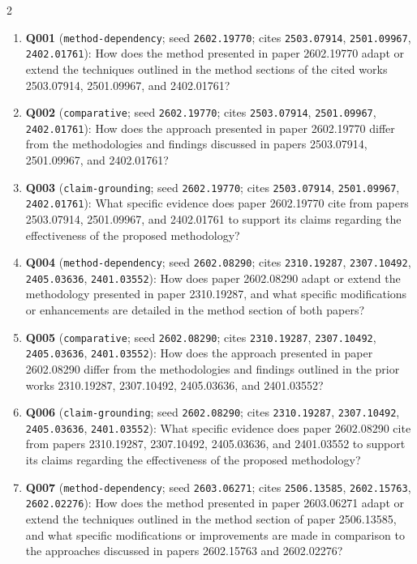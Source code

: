 \documentclass[10pt]{article}
\begin{document}
{\scriptsize\sloppy
\begin{multicols}{2}
\begin{enumerate}[leftmargin=1.0em,itemsep=0.05em,topsep=0pt,parsep=0pt]
  \item \textbf{Q001} (\texttt{method-dependency}; seed \texttt{2602.19770}; cites \texttt{2503.07914}, \texttt{2501.09967}, \texttt{2402.01761}): How does the method presented in paper 2602.19770 adapt or extend the techniques outlined in the method sections of the cited works 2503.07914, 2501.09967, and 2402.01761?
  \item \textbf{Q002} (\texttt{comparative}; seed \texttt{2602.19770}; cites \texttt{2503.07914}, \texttt{2501.09967}, \texttt{2402.01761}): How does the approach presented in paper 2602.19770 differ from the methodologies and findings discussed in papers 2503.07914, 2501.09967, and 2402.01761?
  \item \textbf{Q003} (\texttt{claim-grounding}; seed \texttt{2602.19770}; cites \texttt{2503.07914}, \texttt{2501.09967}, \texttt{2402.01761}): What specific evidence does paper 2602.19770 cite from papers 2503.07914, 2501.09967, and 2402.01761 to support its claims regarding the effectiveness of the proposed methodology?
  \item \textbf{Q004} (\texttt{method-dependency}; seed \texttt{2602.08290}; cites \texttt{2310.19287}, \texttt{2307.10492}, \texttt{2405.03636}, \texttt{2401.03552}): How does paper 2602.08290 adapt or extend the methodology presented in paper 2310.19287, and what specific modifications or enhancements are detailed in the method section of both papers?
  \item \textbf{Q005} (\texttt{comparative}; seed \texttt{2602.08290}; cites \texttt{2310.19287}, \texttt{2307.10492}, \texttt{2405.03636}, \texttt{2401.03552}): How does the approach presented in paper 2602.08290 differ from the methodologies and findings outlined in the prior works 2310.19287, 2307.10492, 2405.03636, and 2401.03552?
  \item \textbf{Q006} (\texttt{claim-grounding}; seed \texttt{2602.08290}; cites \texttt{2310.19287}, \texttt{2307.10492}, \texttt{2405.03636}, \texttt{2401.03552}): What specific evidence does paper 2602.08290 cite from papers 2310.19287, 2307.10492, 2405.03636, and 2401.03552 to support its claims regarding the effectiveness of the proposed methodology?
  \item \textbf{Q007} (\texttt{method-dependency}; seed \texttt{2603.06271}; cites \texttt{2506.13585}, \texttt{2602.15763}, \texttt{2602.02276}): How does the method presented in paper 2603.06271 adapt or extend the techniques outlined in the method section of paper 2506.13585, and what specific modifications or improvements are made in comparison to the approaches discussed in papers 2602.15763 and 2602.02276?

\end{enumerate}
\end{multicols}}
\end{document}
